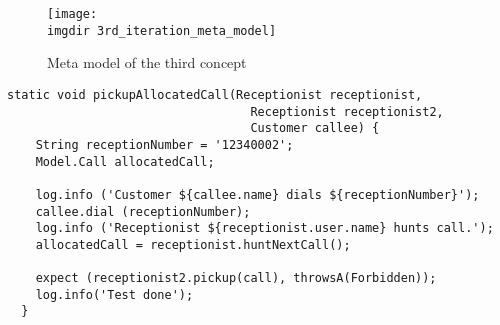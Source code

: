 \documentclass[aspectratio=43]{beamer}
\newcommand{\imgdir}{../Thesis/img/}
\begin{document}
\begin{figure}[!htbp]
  \centering
  \texttt{[image: \\imgdir 3rd\_iteration\_meta\_model]}
  \caption{Meta model of the third concept}
  \label{fig:3rd_iteration_meta_model}
\end{figure}

\begin{lstlisting}[style=Dart, caption=Test code for single call allocation,label={lst:test-code-single-call-allocation}]
  static void pickupAllocatedCall(Receptionist receptionist, 
                                  Receptionist receptionist2, 
                                  Customer callee) {
    String receptionNumber = '12340002';
    Model.Call allocatedCall;
    
    log.info ('Customer ${callee.name} dials ${receptionNumber}');
    callee.dial (receptionNumber);
    log.info ('Receptionist ${receptionist.user.name} hunts call.');
    allocatedCall = receptionist.huntNextCall();
   
    expect (receptionist2.pickup(call), throwsA(Forbidden));
    log.info('Test done');
  }
\end{lstlisting}


\end{document}
